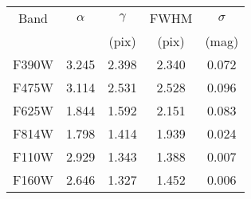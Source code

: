 \begin{tabular}{ccccc}
\hline\hline
Band & $\alpha$ & $\gamma$ & FWHM & $\sigma$ \\
  & & (pix) & (pix) & (mag)\\
\hline
F390W & 3.245 & 2.398 & 2.340 & 0.072 \\
F475W & 3.114 & 2.531 & 2.528 & 0.096 \\
F625W & 1.844 & 1.592 & 2.151 & 0.083 \\
F814W & 1.798 & 1.414 & 1.939 & 0.024 \\
F110W & 2.929 & 1.343 & 1.388 & 0.007 \\
F160W & 2.646 & 1.327 & 1.452 & 0.006 \\
\hline\hline
\end{tabular}
